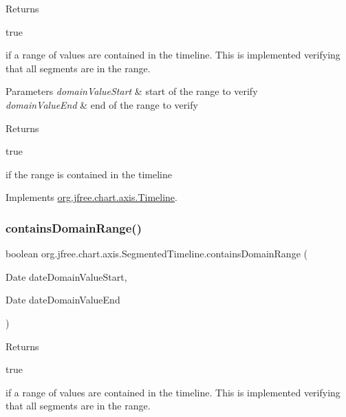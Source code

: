 Returns
\begin{DoxyCode}
\textcolor{keyword}{true} 
\end{DoxyCode}
 if a range of values are contained in the timeline. This is implemented verifying that all segments are in the range.


\begin{DoxyParams}{Parameters}
{\em domain\+Value\+Start} & start of the range to verify \\
\hline
{\em domain\+Value\+End} & end of the range to verify\\
\hline
\end{DoxyParams}
\begin{DoxyReturn}{Returns}

\begin{DoxyCode}
\textcolor{keyword}{true} 
\end{DoxyCode}
 if the range is contained in the timeline 
\end{DoxyReturn}


Implements \mbox{\hyperlink{interfaceorg_1_1jfree_1_1chart_1_1axis_1_1_timeline_a36e80eb3f224df36ab4c3597ef17928f}{org.\+jfree.\+chart.\+axis.\+Timeline}}.

\mbox{\label{classorg_1_1jfree_1_1chart_1_1axis_1_1_segmented_timeline_a71800b05e06d6011fcff21df388e1b63}} 
\subsubsection{\texorpdfstring{contains\+Domain\+Range()}{containsDomainRange()}\hspace{0.1cm}{\footnotesize\ttfamily [2/2]}}
{\footnotesize\ttfamily boolean org.\+jfree.\+chart.\+axis.\+Segmented\+Timeline.\+contains\+Domain\+Range (\begin{DoxyParamCaption}\item[{Date}]{date\+Domain\+Value\+Start,  }\item[{Date}]{date\+Domain\+Value\+End }\end{DoxyParamCaption})}

Returns
\begin{DoxyCode}
\textcolor{keyword}{true} 
\end{DoxyCode}
 if a range of values are contained in the timeline. This is implemented verifying that all segments are in the range.



